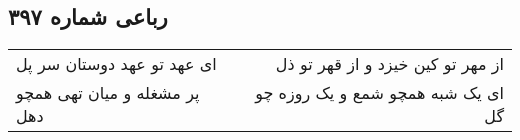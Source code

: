 \begin{center}
\section*{رباعی شماره ۳۹۷}
\label{sec:sh397}
\begin{longtable}{l p{0.5cm} r}
ای عهد تو عهد دوستان سر پل
&&
از مهر تو کین خیزد و از قهر تو ذل
\\
پر مشغله و میان تهی همچو دهل
&&
ای یک شبه همچو شمع و یک روزه چو گل
\\
\end{longtable}
\end{center}
